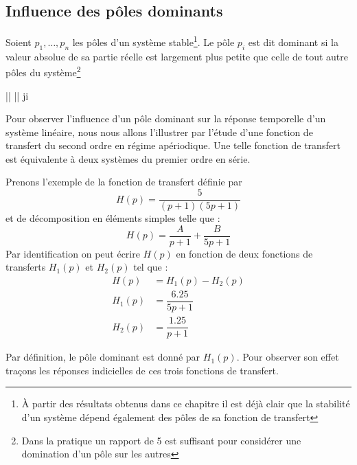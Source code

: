 \subsection{Influence des pôles dominants}

Soient $p_1,\ldots,p_n$ les pôles d'un système stable\footnote{À partir 
des résultats obtenus dans ce chapitre il est déjà clair que la stabilité
d'un système dépend également des pôles de sa fonction de transfert}.
Le pôle $p_i$ est dit dominant si la valeur absolue
de sa partie réelle est largement plus petite que celle de tout autre pôles 
du système\footnote{Dans la pratique un rapport de 5 est 
suffisant pour considérer une domination d'un pôle sur les autres}
\begin{bequation}
	\big|\big| \ll \big|\big|\;\; \forall j\neq i
\end{bequation}

Pour observer l'influence d'un pôle dominant sur 
la réponse temporelle d'un système linéaire, nous
nous allons l'illustrer par l'étude d'une fonction 
de transfert du second ordre en régime apériodique.
Une telle fonction de transfert est équivalente à deux
systèmes du premier ordre en série.

Prenons l'exemple de la fonction de transfert définie par  
$$
H(p)=\dfrac{5}{(p+1)(5p+1)}
$$
et de décomposition en éléments simples telle que :
$$
H(p)=\dfrac{A}{p+1}+\dfrac{B}{5p+1}
$$
Par identification on peut écrire $H(p)$ en fonction de
deux fonctions de transferts $H_1(p)$ et $H_2(p)$ tel que :
\begin{align*}
	H(p)&=H_1(p)-H_2(p)\\
	H_1(p)&=\dfrac{6.25}{5p+1}\\
	H_2(p)&=\dfrac{1.25}{p+1}
\end{align*}

Par définition, le pôle dominant est donné par $H_1(p)$.
Pour observer son effet traçons les réponses indicielles 
de ces trois fonctions de transfert.

